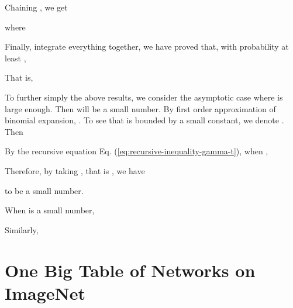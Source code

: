 \documentclass{article}
\begin{document}
Chaining , we get

where



Finally, integrate everything together, we have proved that, with
probability at least , 

That is,


To further simply the above results, we consider the asymptotic case
where  is large enough. Then  will be a small
number. By first order approximation of binomial expansion, .
To see that  is bounded by a small constant, we denote
. Then 


By the recursive equation Eq. (\ref{eq:recursive-inequality-gamma-t}),
when , 

Therefore, by taking ,
that is , we have

to be a small number. 

When  is a small number, 

Similarly,




\clearpage \newpage

\section{One Big Table of Networks on ImageNet}
\label{sec:one-big-table}
\end{document}

